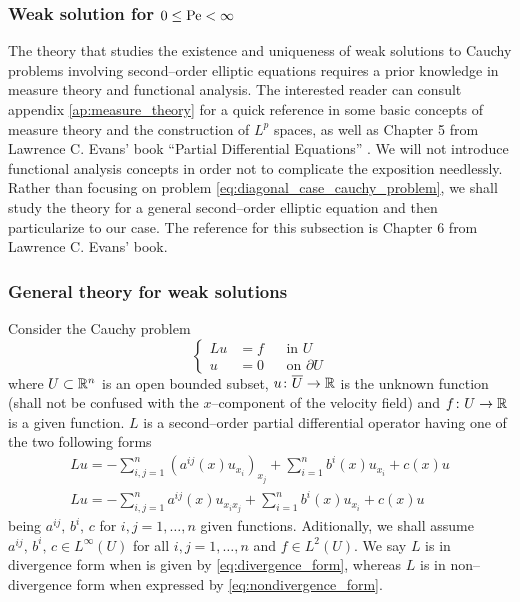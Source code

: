 
\subsubsection{Weak solution for \texorpdfstring{$0 \leq \mathrm{Pe} <
\infty$}{finite Péclet's number}} \label{sec:diagonal_Pe_fin_weak}

The theory that studies the existence and uniqueness of weak solutions to Cauchy
problems involving second--order elliptic equations requires a prior knowledge
in measure theory and functional analysis. The interested reader can consult
appendix \ref{ap:measure_theory} for a quick reference in some basic concepts of
measure theory and the construction of $L^p$ spaces, as well as Chapter 5 from
Lawrence C. Evans' book ``Partial Differential Equations'' \cite{evans1998pde}.
We will not introduce functional analysis concepts in order not to complicate
the exposition needlessly. Rather than focusing on problem
\eqref{eq:diagonal_case_cauchy_problem}, we shall study the theory for a general
second--order elliptic equation and then particularize to our case. The
reference for this subsection is Chapter 6 from Lawrence C. Evans' book.

\subsubsection*{General theory for weak solutions}

Consider the Cauchy problem
\begin{equation} \label{eq:second_order_elliptic_problem}
	\left\{
		\begin{aligned}
			L u &= f & &\text{in } U \\
			u &= 0 & &\text{on } \partial U
		\end{aligned}
	\right.
\end{equation}
where $U \subset \mathbb{R}^n$ is an open bounded subset, $u \colon \overline{U}
\rightarrow \mathbb{R}$ is the unknown function (shall not be confused with the
$x$--component of the velocity field) and $f \colon U \rightarrow \mathbb{R}$ is a
given function. $L$ is a second--order partial differential operator having one
of the two following forms
\begin{gather}
	L u = - \sum_{i,j=1}^n (a^{ij}(x) u_{x_i})_{x_j} + \sum_{i=1}^n b^i(x) u_{x_i} + c(x) u \label{eq:divergence_form}	\\
	L u = - \sum_{i,j=1}^n a^{ij}(x) u_{x_i x_j} + \sum_{i=1}^n b^i(x) u_{x_i} + c(x) u	
	\label{eq:nondivergence_form}
\end{gather}
being $a^{ij}, \, b^i, \, c$ for $i, j = 1, \ldots, n$ given functions.
Aditionally, we shall assume $a^{ij}, \, b^i, \, c \in L^\infty(U)$ for all $i,
j = 1, \ldots, n$ and $f \in L^2(U)$. We say $L$ is in divergence form when is
given by \eqref{eq:divergence_form}, whereas $L$ is in non--divergence form when
expressed by \eqref{eq:nondivergence_form}.


